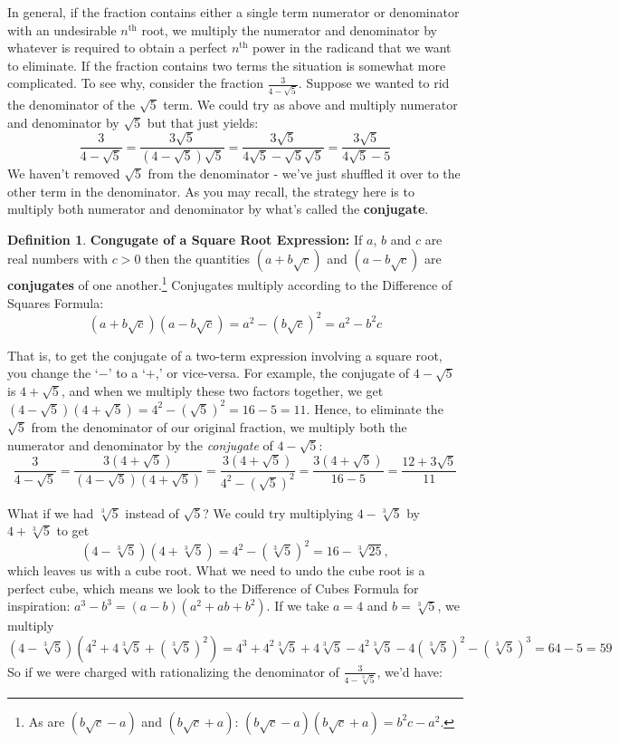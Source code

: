 \documentclass[11pt]{article}
\theoremstyle{definition}  %
\newtheorem{defn}{\bf Definition}
\newcommand{\bbm}{\begin{boxedminipage}{6.41in}}
\newcommand{\ebm}{\end{boxedminipage}}
\begin{document}
 In general, if the fraction contains either a single term numerator or denominator with an undesirable $n^{\text{th}}$ root, we multiply the numerator and denominator by whatever is required to obtain a perfect $n^{\text{th}}$ power in the radicand that we want to eliminate. If the fraction contains two terms the situation is somewhat more complicated.  To see why, consider the fraction $\frac{3}{4 - \sqrt{5}}$.  Suppose we wanted to rid the denominator of the $\sqrt{5}$ term.  We could try as above and multiply numerator and denominator by $\sqrt{5}$ but that just yields: \[ \dfrac{3}{4 - \sqrt{5}} = \dfrac{3\sqrt{5}}{(4 - \sqrt{5})\sqrt{5}} = \dfrac{3\sqrt{5}}{4\sqrt{5} - \sqrt{5}\sqrt{5}} = \dfrac{3\sqrt{5}}{4\sqrt{5} - 5}\] We haven't removed $\sqrt{5}$ from the denominator - we've just shuffled it over to the other term in the denominator.  As you may recall, the strategy here is to multiply both numerator and denominator by what's called the \textbf{conjugate}.  

\medskip

\colorbox{ResultColor}{\bbm

\begin{defn}\label{squarerootconj} \textbf{Congugate of a Square Root Expression:}  If $a$, $b$ and $c$ are real numbers with $c > 0$ then the quantities $(a + b \sqrt{c})$ and $(a - b\sqrt{c})$ are \textbf{conjugates} of one another.\footnote{As are $(b\sqrt{c} -a)$ and $(b\sqrt{c} + a)$: $(b\sqrt{c} -a)(b\sqrt{c} + a) = b^2c - a^2$.}  Conjugates multiply according to the Difference of Squares Formula:  \[ (a + b \sqrt{c})(a - b\sqrt{c}) = a^2 - (b \sqrt{c})^2 = a^2 - b^2c\]
\end{defn}
\ebm}

\medskip

That is, to get the conjugate of a two-term expression involving a square root, you change the `$-$' to a `$+$,' or vice-versa.  For example, the conjugate of $4 - \sqrt{5}$ is $4 + \sqrt{5}$, and when we multiply these two factors together, we get $(4 - \sqrt{5})(4 + \sqrt{5}) = 4^2 - (\sqrt{5})^2 = 16 - 5 = 11$.  Hence, to eliminate the $\sqrt{5}$ from the denominator of our original fraction, we multiply both the numerator and denominator by the \textit{conjugate} of $4-\sqrt{5}$: \[\dfrac{3}{4 - \sqrt{5}} = \dfrac{3 (4 + \sqrt{5})}{(4 - \sqrt{5})(4 + \sqrt{5})} = \dfrac{3 (4 + \sqrt{5})}{4^2 - (\sqrt{5})^2} = \dfrac{3(4 + \sqrt{5})}{16 - 5} = \dfrac{12 + 3\sqrt{5}}{11}\] 

What if we had $\sqrt[3]{5}$ instead of $\sqrt{5}$?  We could try multiplying $4 - \sqrt[3]{5}$ by $4 + \sqrt[3]{5}$ to get  \[(4 - \sqrt[3]{5})(4 + \sqrt[3]{5}) = 4^2 - (\sqrt[3]{5})^2 = 16 - \sqrt[3]{25},\]
which leaves us with a cube root.  What we need to undo the cube root is a perfect cube, which means we look to the Difference of Cubes Formula for inspiration:  $a^3 - b^3 = (a-b)(a^2+ab+b^2)$.  If we take $a = 4$ and $b = \sqrt[3]{5}$, we multiply \[ (4 - \sqrt[3]{5})(4^2 + 4\sqrt[3]{5} + (\sqrt[3]{5})^2) = 4^3 + 4^2\sqrt[3]{5} + 4 \sqrt[3]{5} - 4^2\sqrt[3]{5}-4(\sqrt[3]{5})^2 - (\sqrt[3]{5})^3 = 64 - 5 = 59\]
So if we were charged with rationalizing the denominator of $\frac{3}{4 - \sqrt[3]{5}}$, we'd have:
\end{document}

